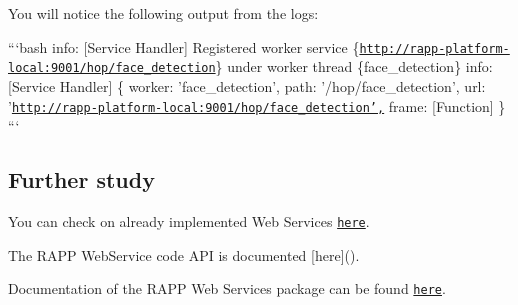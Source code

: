 You will notice the following output from the logs\-:

```bash info\-: \mbox{[}Service Handler\mbox{]} Registered worker service \{\href{http://rapp-platform-local:9001/hop/face_detection}{\tt http\-://rapp-\/platform-\/local\-:9001/hop/face\-\_\-detection}\} under worker thread \{face\-\_\-detection\} info\-: \mbox{[}Service Handler\mbox{]} \{ worker\-: 'face\-\_\-detection', path\-: '/hop/face\-\_\-detection', url\-: '\href{http://rapp-platform-local:9001/hop/face_detection',}{\tt http\-://rapp-\/platform-\/local\-:9001/hop/face\-\_\-detection',} frame\-: \mbox{[}Function\mbox{]} \} ```

\subsection*{Further study}

You can check on already implemented Web Services \href{https://github.com/rapp-project/rapp-platform/tree/master/rapp_web_services/services}{\tt here}.

The R\-A\-P\-P Web\-Service code A\-P\-I is documented \mbox{[}here\mbox{]}().

Documentation of the R\-A\-P\-P Web Services package can be found \href{https://github.com/rapp-project/rapp-platform/tree/master/rapp_web_services}{\tt here}. 